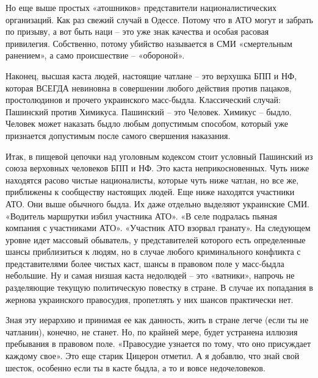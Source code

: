 Но еще выше простых «атошников» представители националистических организаций.
Как раз свежий случай в Одессе. Потому что в АТО могут и забрать по призыву, а
вот быть наци – это уже знак качества и особая расовая привилегия. Собственно,
потому убийство называется в СМИ «смертельным ранением», а само происшествие –
«обороной».

Наконец, высшая каста людей, настоящие чатлане – это верхушка БПП и НФ, которая
ВСЕГДА невиновна в совершении любого действия против пацаков, простолюдинов и
прочего украинского масс-быдла. Классический случай: Пашинский против Химикуса.
Пашинский – это Человек. Химикус – быдло. Человек может наказать быдло любым
допустимым способом, который уже признается допустимым после самого свершения
наказания.

Итак, в пищевой цепочки над уголовным кодексом стоит условный Пашинский из
союза верховных человеков БПП и НФ. Это каста неприкосновенных. Чуть ниже
находятся расово чистые националисты, которые чуть ниже чатлан, но все же,
приближены к сообществу настоящих людей. Еще ниже находятся участники АТО. Они
выше обычного быдла. Их даже отдельно выделяют украинские СМИ. «Водитель
маршрутки избил участника АТО». «В селе подралась пьяная компания с участниками
АТО». «Участник АТО взорвал гранату». На следующем уровне идет массовый
обыватель, у представителей которого есть определенные шансы приблизиться к
людям, но в случае любого криминального конфликта с представителями более
чистых каст, шансы в правовом поле у масс-быдла небольшие. Ну и самая низшая
каста недолюдей – это «ватники», напрочь не разделяющие текущую политическую
повестку в стране. В случае их попадания в жернова украинского правосудия,
пропетлять у них шансов практически нет.

Зная эту иерархию и принимая ее как данность, жить в стране легче (если ты не
чатланин), конечно, не станет. Но, по крайней мере, будет устранена иллюзия
пребывания в правовом поле. «Правосудие узнается по тому, что оно присуждает
каждому свое». Это еще старик Цицерон отметил. А я добавлю, что знай свой
шесток, особенно если ты в касте быдла, а то и вовсе недочеловеков.

